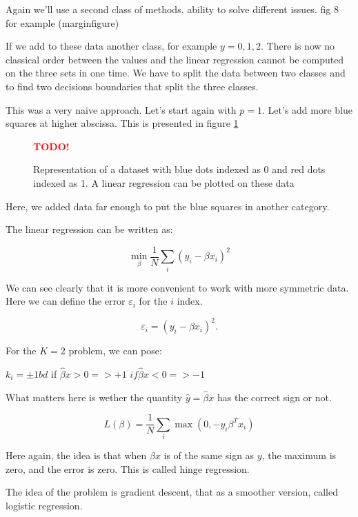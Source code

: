 \documentclass[a4paper]{tufte-book}
\newcommand{\TODO}{\textcolor{red}{\bf TODO!}\xspace}
\begin{document}
Again we'll use a second class of methods. ability to solve different issues.
fig 8 for example (marginfigure)

If we add to these data another class, for example $y=0,1,2$. There is now no
classical order between the values and the linear regression cannot be computed
on the three sets in one time. We have to split the data between two classes and
to find two decisions boundaries that split the three classes.

This was a very naive approach. Let's start again with $p=1$. Let's add more blue
squares at higher abscissa. This is presented in figure \ref{supvlearn7}


\begin{figure}
    \TODO
    \caption{Representation of a dataset with blue dots indexed as 0 and red
        dots indexed as 1. A linear regression can be plotted on these data
    }
    \label{supvlearn7}
\end{figure}

Here, we added data far enough to put the blue squares in another category.

The linear regression can be written as:

\begin{equation}
    \min_\beta \frac{1}{N} \sum_i (y_i - \beta x_i)^2
\end{equation}

We can see clearly that it is more convenient to work with more symmetric data.
Here we can define the error $\varepsilon_i$ for the $i$ index.

\begin{equation}
    \varepsilon_i = (y_i - \beta x_i)^2.
\end{equation}

For the $K=2$ problem, we can pose:

$k_i = \pm 1 bd$ if $\hat \beta x >0 => +1$
$if \hat \beta x<0 => -1$

What matters here is wether the quantity $\hat y = \hat \beta x$ has the correct
sign or not.

\begin{equation}
    L(\beta) = \frac{1}{N} \sum_i \max(0, -y_i\beta^T x_i)
\end{equation}

Here again, the idea is that when $\beta x$ is of the same sign as $y$, the
maximum is zero, and the error is zero. This is called hinge regression.

The idea of the problem is gradient descent, that as a smoother version, called
logistic regression.
\end{document}
